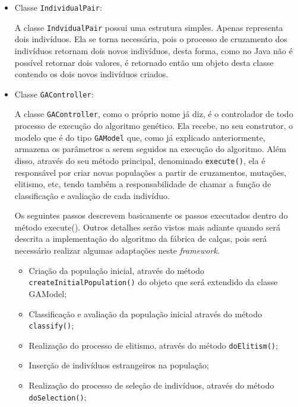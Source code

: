 \begin{itemize}
\begin{itemize}
	\end{itemize}
	
	
	\item Classe \texttt{IndividualPair}:
	\par A classe \texttt{IndvidualPair} possui uma estrutura simples. Apenas
	representa dois indivíduos. Ela se torna necessária, pois o processo de
	cruzamento dos indivíduos retornam dois novos indivíduos, desta forma, como 
	no Java não é possível retornar dois valores, é retornado então um objeto desta
	classe contendo os dois novos indivíduos criados. 
	
	
	\item Classe \texttt{GAController}:
	\par A classe \texttt{GAController}, como o próprio nome já diz, é o
	controlador de todo processo de execução do algoritmo genético.
	Ela recebe, no seu construtor, o modelo que é do tipo \texttt{GAModel} que, como
	já explicado anteriormente, armazena os parâmetros a serem seguidos na
	execução do algoritmo. Além disso, através do seu método principal,
	denominado \texttt{execute()}, ela é responsável por criar novas populações a
	partir de cruzamentos, mutações, elitismo, etc, tendo também a
	responsabilidade de chamar a função de classificação e avaliação de cada indivíduo.
	
	\par Os seguintes passos descrevem basicamente os passos executados dentro do
	método execute(). Outros detalhes serão vistos mais adiante quando será
	descrita a implementação do algoritmo da fábrica de calças, pois será
	necessário realizar algumas adaptações neste \textit{framework}.
	
	\begin{itemize}
		\item	Criação da população inicial, através do método \texttt{createInitialPopulation()}
		do objeto que será extendido da classe GAModel;
		
		\item Classificação e avaliação da população inicial através do método
		\texttt{classify()};
		
		\item Realização do processo de elitismo, através do método
		\texttt{doElitism()};
		
		\item Inserção de indivíduos estrangeiros na população;
		
		\item Realização do processo de seleção de indivíduos, através do método \texttt{doSelection()};
		

\end{itemize}
\end{itemize}
